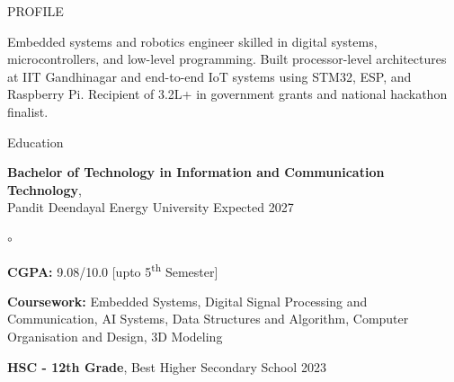 \documentclass[10pta]{resume} %
\begin{document}


\begin{rSection}{PROFILE}

{Embedded systems and robotics engineer skilled in digital systems, microcontrollers, and low-level programming. Built processor-level architectures at IIT Gandhinagar and end-to-end IoT systems using STM32, ESP, and Raspberry Pi. Recipient of \rupee 3.2L+ in government grants and national hackathon finalist.}

\end{rSection}



\begin{rSection}{Education}

{\bf Bachelor of Technology in Information and Communication Technology},\\ Pandit Deendayal Energy University \hfill {Expected 2027}
\begin{list}{$\circ$}{}
    \item \textbf{CGPA:} 9.08/10.0  [upto 5\textsuperscript{th} Semester]
    \item \textbf{Coursework:} Embedded Systems, Digital Signal Processing and Communication, AI Systems, Data Structures and Algorithm, Computer Organisation and Design, 3D Modeling
\end{list}


{\bf HSC - 12th Grade}, Best Higher Secondary School \hfill {2023}


\end{rSection}
\end{document}

